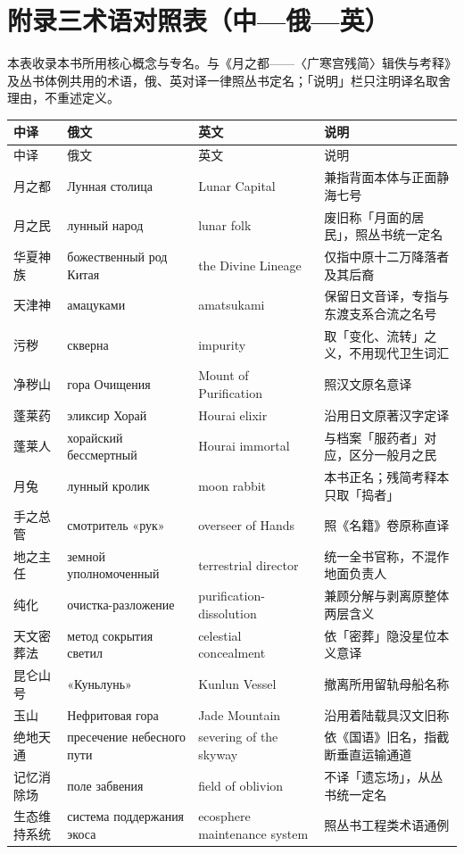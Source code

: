 \clearpage
\chapter*{附录三\quad 术语对照表（中—俄—英）}
{}

本表收录本书所用核心概念与专名。与《月之都——〈广寒宫残简〉辑佚与考释》及丛书体例共用的术语，俄、英对译一律照丛书定名；「说明」栏只注明译名取舍理由，不重述定义。

\vspace{2mm}
{\footnotesize\renewcommand{\arraystretch}{1.12}
\begin{longtable}{@{}p{25mm}p{35mm}p{35mm}p{37mm}@{}}
\toprule
中译 & 俄文 & 英文 & 说明 \\
\midrule
\endfirsthead
\toprule
中译 & 俄文 & 英文 & 说明 \\
\midrule
\endhead
\bottomrule
\endfoot
月之都 & Лунная столица & Lunar Capital & 兼指背面本体与正面静海七号 \\
月之民 & лунный народ & lunar folk & 废旧称「月面的居民」，照丛书统一定名 \\
华夏神族 & божественный род Китая & the Divine Lineage & 仅指中原十二万降落者及其后裔 \\
天津神 & амацуками & amatsukami & 保留日文音译，专指与东渡支系合流之名号 \\
污秽 & скверна & impurity & 取「变化、流转」之义，不用现代卫生词汇 \\
净秽山 & гора Очищения & Mount of Purification & 照汉文原名意译 \\
蓬莱药 & эликсир Хорай & Hourai elixir & 沿用日文原著汉字定译 \\
蓬莱人 & хорайский бессмертный & Hourai immortal & 与档案「服药者」对应，区分一般月之民 \\
月兔 & лунный кролик & moon rabbit & 本书正名；残简考释本只取「捣者」 \\
手之总管 & смотритель «рук» & overseer of Hands & 照《名籍》卷原称直译 \\
地之主任 & земной уполномоченный & terrestrial director & 统一全书官称，不混作地面负责人 \\
纯化 & очистка-разложение & purification-dissolution & 兼顾分解与剥离原整体两层含义 \\
天文密葬法 & метод сокрытия светил & celestial concealment & 依「密葬」隐没星位本义意译 \\
昆仑山号 & «Куньлунь» & Kunlun Vessel & 撤离所用留轨母船名称 \\
玉山 & Нефритовая гора & Jade Mountain & 沿用着陆载具汉文旧称 \\
绝地天通 & пресечение небесного пути & severing of the skyway & 依《国语》旧名，指截断垂直运输通道 \\
记忆消除场 & поле забвения & field of oblivion & 不译「遗忘场」，从丛书统一定名 \\
生态维持系统 & система поддержания экоса & ecosphere maintenance system & 照丛书工程类术语通例 \\
\end{longtable}}

